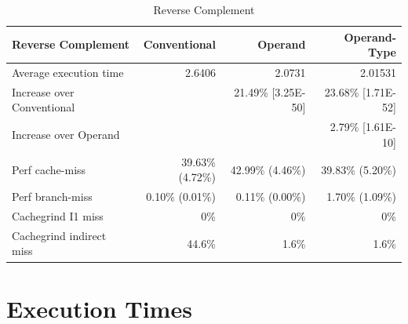 \documentclass[english,a4paper,12pt]{report}
\begin{document}
\begin{table}[!htb]
  \begin{center}
    \begin{tabular}{lrrr}
      Reverse Complement & Conventional & Operand & Operand-Type\\
      \hline
      Average execution time & 2.6406 & 2.0731 & 2.01531\\
      Increase over Conventional &  & 21.49\% [3.25E-50] & 23.68\% [1.71E-52]\\
      Increase over Operand &  &  & 2.79\% [1.61E-10]\\
      Perf cache-miss & 39.63\% (4.72\%) & 42.99\% (4.46\%) & 39.83\% (5.20\%)\\
      Perf branch-miss & 0.10\% (0.01\%) & 0.11\% (0.00\%) & 1.70\% (1.09\%)\\
      Cachegrind I1 miss & 0\% & 0\% & 0\%\\
      Cachegrind indirect miss & 44.6\% & 1.6\% & 1.6\%\\
    \end{tabular}
  \end{center}
  \caption{Reverse Complement}
\end{table}

\section{Execution Times}
\end{document}
